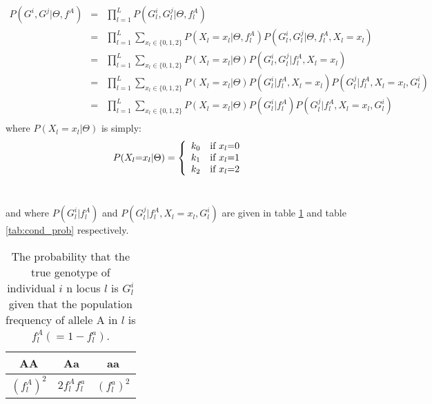 \documentclass[a4paper, 11pt]{article}
\begin{document}
\scriptsize%
\begin{eqnarray*}%
P(G^{i},G^{j}| \Theta,f^A)&=& \prod_{l=1}^L P(G^{i}_l,G^{j}_l| \Theta,f^A_l)\\
&=&\prod_{l=1}^L \sum_{x_l\in\{0,1,2\}}P(X_l=x_l|\Theta,f^A_l)P(G^{i}_l,G^{j}_l| \Theta,f^A_l,X_l=x_l)\\ 
&=&\prod_{l=1}^L \sum_{x_l\in\{0,1,2\}}P(X_l=x_l|\Theta)P(G^{i}_l,G^{j}_l|f^A_l,X_l=x_l)\\ 
&=&\prod_{l=1}^L \sum_{x_l\in\{0,1,2\}}P(X_l=x_l|\Theta)P(G^{i}_l|f^A_l,X_l=x_l)P(G^{j}_l|f^A_l,X_l=x_l,G^{i}_l)\\ 
&=&\prod_{l=1}^L \sum_{x_l\in\{0,1,2\}}P(X_l=x_l|\Theta)P(G^{i}_l|f^A_l)P(G^{j}_l|f^A_l,X_l=x_l,G^{i}_l)\\ 
\end{eqnarray*}%
\normalsize
where $P(X_l=x_l|\Theta)$ is simply:
\small
\begin{equation}
P(X_{l}\text{=}x_{l}| \Theta)\normalsize= \left\{ \begin{array}{ll}
k_0 & \text{if} \ x_{l} \text{=} 0 \\
k_1 & \text{if} \ x_{l} \text{=} 1 \\
k_2 & \text{if} \ x_{l} \text{=} 2 \\
\end{array} \right.
\label{eq1}
\end{equation}\\%
\normalsize

\noindent
and where $P(G^{i}_l|f^A_l)$ and $P(G^{j}_l|f^A_l,X_l=x_l,G^{i}_l)$ are given in table \ref{tab:prob} and table \ref{tab:cond_prob} respectively.

\begin{table}[h!]
  \centering
  \begin{tabular}{|c|c|c|}
\hline
  AA & Aa & aa\\
\hline
  $(f^A_l)^2$ & $2f^A_lf^a_l$& $(f^a_l)^2$\\
\hline
\end{tabular}
  \caption{The probability that the true genotype of individual $i$ n locus $l$ is $G^{i}_l$given that the population frequency of allele A in $l$ is $f^A_l (=1-f^a_l)$.}
\label{tab:prob}
\end{table}
\end{document}
